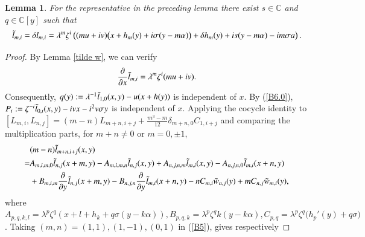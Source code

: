 \documentclass[12pt,reqno]{amsart}
\def\C{\mathbb{C}}
\numberwithin{equation}{section}
\newtheorem{lemm}[theo]{Lemma}
\begin{document}
\begin{lemm}\label{tilde l}
    For the representative in the preceding lemma there exist $s\in\C$ and $q\in\C[y]$ such that
    \begin{equation}\label{B6}
\begin{aligned}
\Tilde l_{m,i}=\delta l_{m,i}
=\lambda^m\zeta^i\left(
 (mu+iv)\bigl(x+h_m(y)+i\sigma(y-m\alpha)\bigr)+
 \delta h_m(y)+is(y-m\alpha)-im\sigma a
\right).
\end{aligned}
\end{equation}
\end{lemm}
\begin{proof}
    By Lemma \ref{tilde w}, we can verify 
\begin{equation}\label{B6.0}
\begin{aligned}
\frac{\partial}{\partial{x}}\Tilde l_{m,i}
=\lambda^m\zeta^i(mu+iv).
\end{aligned}
\end{equation}
   Consequently, $q(y):=\lambda^{-1}\Tilde l_{1,0}(x,y)-u(x+h(y))$ 
is independent of $x$. By (\ref{B6.0}), $P_i:=\zeta^{-i}\Tilde l_{0,i}(x,y)-ivx-i^2v\sigma y$ is independent of $x$. Applying the cocycle identity
to $[L_{m,i},L_{n,j}]
=(m-n)L_{m+n,i+j}
+\frac{m^3-m}{12}\delta_{m+n,0}C_{1,i+j}$
and comparing the multiplication parts, for $m+n\neq 0$ or $m=0,\pm 1$, 
\begin{equation}\label{B5}
\begin{aligned}
&(m-n)\Tilde l_{m+n,i+j}(x,y) \\
=&A_{m,i,m,0}\Tilde l_{n,j}(x+m,y)-A_{m,i,m,n}\Tilde l_{n,j}(x,y)+A_{n,j,n,m}\Tilde l_{m,i}(x,y)-A_{n,j,n,0}\Tilde l_{m,i}(x+n,y)\\
&+B_{m,i,m}\frac{\partial}{\partial y}\Tilde l_{n,j}(x+m,y)-B_{n,j,n}\frac{\partial}{\partial y}\Tilde l_{m,i}(x+n,y)-nC_{m,i}\Tilde w_{n,j}(y)+mC_{n,j}\Tilde w_{m,i}(y),
\end{aligned}
\end{equation}
 where $A_{p,q,k,l}=\lambda^p\zeta^q(x+l+h_k+q\sigma(y-k\alpha)),B_{p,q,k}=\lambda^p\zeta^qk(y-k\alpha),C_{p,q}=\lambda^p\zeta^q\bigl(h_p'(y)+q\sigma\bigr)$.
   Taking $(m,n)=(1,1),(1,-1),(0,1)$ in (\ref{B5}), gives respectively

\end{proof}
\end{document}
